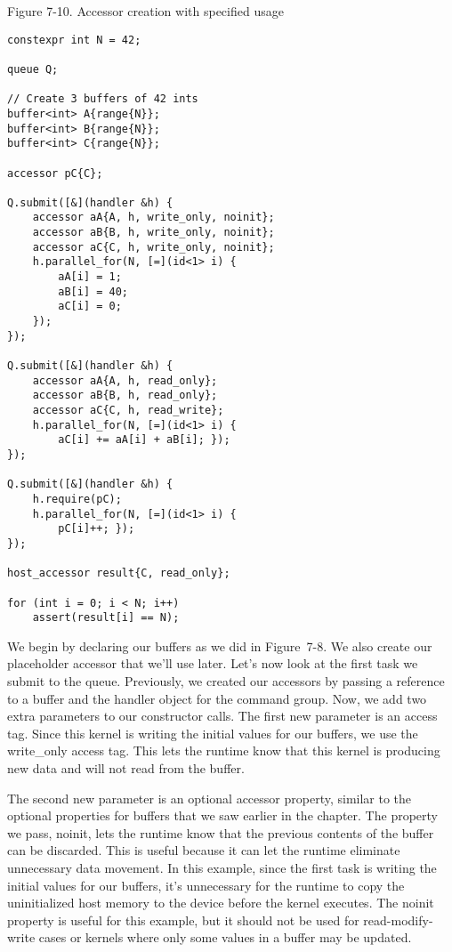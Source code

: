 \hspace*{\fill} \par %
Figure 7-10. Accessor creation with specified usage
\begin{lstlisting}[caption={}]
constexpr int N = 42;

queue Q;

// Create 3 buffers of 42 ints
buffer<int> A{range{N}};
buffer<int> B{range{N}};
buffer<int> C{range{N}};

accessor pC{C};

Q.submit([&](handler &h) {
	accessor aA{A, h, write_only, noinit};
	accessor aB{B, h, write_only, noinit};
	accessor aC{C, h, write_only, noinit};
	h.parallel_for(N, [=](id<1> i) {
		aA[i] = 1;
		aB[i] = 40;
		aC[i] = 0;
	});
});

Q.submit([&](handler &h) {
	accessor aA{A, h, read_only};
	accessor aB{B, h, read_only};
	accessor aC{C, h, read_write};
	h.parallel_for(N, [=](id<1> i) {
		aC[i] += aA[i] + aB[i]; });
});

Q.submit([&](handler &h) {
	h.require(pC);
	h.parallel_for(N, [=](id<1> i) {
		pC[i]++; });
});

host_accessor result{C, read_only};

for (int i = 0; i < N; i++)
	assert(result[i] == N);
\end{lstlisting}

We begin by declaring our buffers as we did in Figure 7-8. We also create our placeholder accessor that we’ll use later. Let’s now look at the first task we submit to the queue. Previously, we created our accessors by passing a reference to a buffer and the handler object for the command group. Now, we add two extra parameters to our constructor calls. The first new parameter is an access tag. Since this kernel is writing the initial values for our buffers, we use the write\_only access tag. This lets the runtime know that this kernel is producing new data and will not read from the buffer.\par

The second new parameter is an optional accessor property, similar to the optional properties for buffers that we saw earlier in the chapter. The property we pass, noinit, lets the runtime know that the previous contents of the buffer can be discarded. This is useful because it can let the runtime eliminate unnecessary data movement. In this example, since the first task is writing the initial values for our buffers, it’s unnecessary for the runtime to copy the uninitialized host memory to the device before the kernel executes. The noinit property is useful for this example, but it should not be used for read-modify-write cases or kernels where only some values in a buffer may be updated.\par

